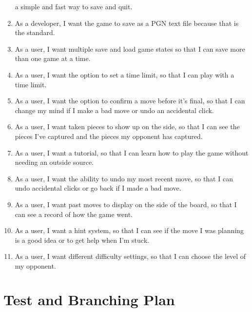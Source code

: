 \documentclass{article}
\begin{document}
\begin{enumerate}
	a simple and fast way to save and quit.
		\item As a developer, I want the game to save as a PGN text file because that is the standard.
		\item As a user, I want multiple save and load game states so that I can save more than one
	game at a time.
		\item As a user, I want the option to set a time limit, so that I can play with a time limit.
		\item As a user, I want the option to confirm a move before it's final, so that I can change
	my mind if I make a bad move or undo an accidental click.
		\item As a user, I want taken pieces to show up on the side, so that I can see the pieces I've
	captured and the pieces my opponent has captured.
		\item As a user, I want a tutorial, so that I can learn how to play the game without needing
	an outside source.
		\item As a user, I want the ability to undo my most recent move, so that I can undo accidental
	clicks or go back if I made a bad move.
		\item As a user, I want past moves to display on the side of the board, so that I can see a 
	record of how the game went.
		\item As a user, I want a hint system, so that I can see if the move I was planning is a good
	idea or to get help when I'm stuck.
		\item As a user, I want different difficulty settings, so that I can choose the level of my
	opponent.
	\end{enumerate}
	\newpage
	
	\section{Test and Branching Plan}
\end{document}
